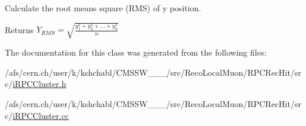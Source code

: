 Calculate the root means square (R\-M\-S) of y position. 

\begin{DoxyReturn}{Returns}
$Y_{RMS}=\sqrt{\frac{y_1^2+ y_2^2+\ldots+y_n^2}{n}}$ 
\end{DoxyReturn}


The documentation for this class was generated from the following files\-:\begin{DoxyCompactItemize}
\item 
/afs/cern.\-ch/user/k/kshchabl/\-C\-M\-S\-S\-W\-\_\-\_\-\_/src/\-Reco\-Local\-Muon/\-R\-P\-C\-Rec\-Hit/src/\hyperlink{iRPCCluster_8h}{i\-R\-P\-C\-Cluster.\-h}\item 
/afs/cern.\-ch/user/k/kshchabl/\-C\-M\-S\-S\-W\-\_\-\_\-\_/src/\-Reco\-Local\-Muon/\-R\-P\-C\-Rec\-Hit/src/\hyperlink{iRPCCluster_8cc}{i\-R\-P\-C\-Cluster.\-cc}\end{DoxyCompactItemize}
